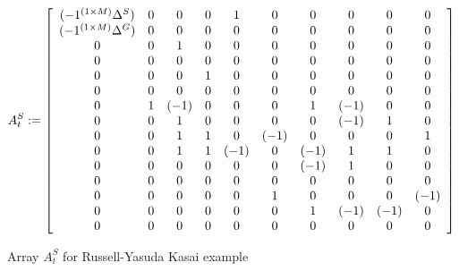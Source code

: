 \begin{figure}[ht]
\caption{Array $A^S_t$ for Russell-Yasuda Kasai example}
\label{RY:ASfig}
\small{
\[
A^S_t \assign\left[
\begin{array}{cccccccccc}%
(-1^{(1\times M)}\Delta^S)	&0	&0	&0	&1	&0	&0	&0	&0	&0\\%
(-1^{(1\times M)}\Delta^G)	&0	&0	&0	&0	&0	&0	&0	&0	&0\\%
0	&0	&1	&0	&0	&0	&0	&0	&0	&0\\%
0	&0	&0	&0	&0	&0	&0	&0	&0	&0\\%
0	&0	&0	&1	&0	&0	&0	&0	&0	&0\\%
0	&0	&0	&0	&0	&0	&0	&0	&0	&0\\%
0	&1	&(-1)	&0	&0	&0	&1	&(-1)	&0	&0\\%
0	&0	&1	&0	&0	&0	&0	&(-1)	&1	&0\\%
0	&0	&1	&1	&0	&(-1)	&0	&0	&0	&1\\%
0	&0	&1	&1	&(-1)	&0	&(-1)	&1	&1	&0\\%
0	&0	&0	&0	&0	&0	&(-1)	&1	&0	&0\\%
0	&0	&0	&0	&0	&0	&0	&0	&0	&0\\%
0	&0	&0	&0	&0	&1	&0	&0	&0	&(-1)\\%
0	&0	&0	&0	&0	&0	&1	&(-1)	&(-1)	&0\\%
0	&0	&0	&0	&0	&0	&0	&0	&0	&0\\%
\end{array}
\right]
\]
}
\end{figure}


